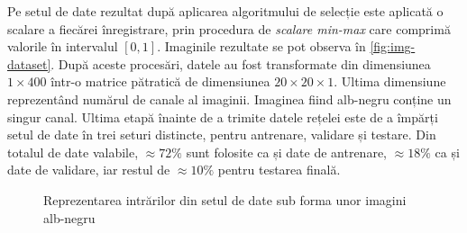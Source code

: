 Pe setul de date rezultat după aplicarea algoritmului de selecție este aplicată o scalare a fiecărei înregistrare, prin procedura de \textit{scalare min-max} care comprimă valorile în intervalul $[0,1]$. Imaginile rezultate se pot observa în \autoref{fig:img-dataset}. După aceste procesări, datele au fost transformate din dimensiunea $1\times400$ într-o matrice pătratică de dimensiunea $20\times20\times1$. Ultima dimensiune reprezentând numărul de canale al imaginii. Imaginea fiind alb-negru conține un singur canal. Ultima etapă înainte de a trimite datele rețelei este de a împărți setul de date în trei seturi distincte, pentru antrenare, validare și testare. Din totalul de date valabile, $\approx72\%$ sunt folosite ca și date de antrenare, $\approx18\%$ ca și date de validare, iar restul de $\approx10\%$ pentru testarea finală. 
\begin{figure}[ht]
\centering
{}
\qquad
{}
\qquad
{}
\caption{Reprezentarea intrărilor din setul de date sub forma unor imagini alb-negru}\label{fig:img-dataset}
\end{figure}

